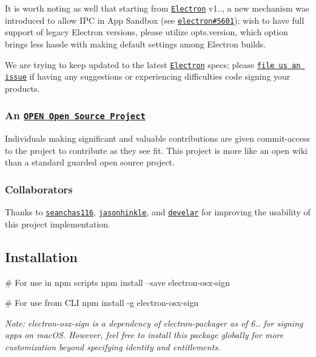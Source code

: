 It is worth noting as well that starting from \href{https://github.com/electron/electron}{\tt Electron} v1.., a new mechanism was introduced to allow I\+PC in App Sandbox (see \href{https://github.com/electron/electron/pull/5601}{\tt electron\#5601}); wish to have full support of legacy Electron versions, please utilize {\ttfamily opts.\+version}, which option brings less hassle with making default settings among Electron builds.

We are trying to keep updated to the latest \href{https://github.com/electron/electron}{\tt Electron} specs; please \href{https://github.com/electron-userland/electron-osx-sign/issues/new}{\tt file us an issue} if having any suggestions or experiencing difficulties code signing your products.

\subsubsection*{An \href{http://openopensource.org/}{\tt O\+P\+EN Open Source Project}}

Individuals making significant and valuable contributions are given commit-\/access to the project to contribute as they see fit. This project is more like an open wiki than a standard guarded open source project.

\subsubsection*{Collaborators}

Thanks to \href{https://github.com/seanchas116}{\tt seanchas116}, \href{https://github.com/jasonhinkle}{\tt jasonhinkle}, and \href{https://github.com/develar}{\tt develar} for improving the usability of this project implementation.

\subsection*{Installation}


\begin{DoxyCode}
# For use in npm scripts
npm install --save electron-osx-sign
\end{DoxyCode}



\begin{DoxyCode}
# For use from CLI
npm install -g electron-osx-sign
\end{DoxyCode}


{\itshape Note\+: {\ttfamily electron-\/osx-\/sign} is a dependency of {\ttfamily electron-\/packager} as of 6.. for signing apps on mac\+OS. However, feel free to install this package globally for more customization beyond specifying identity and entitlements.}

